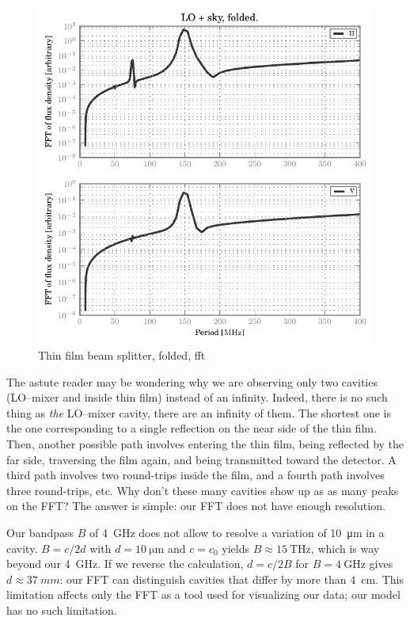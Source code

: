 \begin{figure}[hbtp]
    \centering
    \includegraphics{thin_film_beam_splitter_folded_fft}
    \caption{Thin film beam splitter, folded, fft}
    \label{fig:thin_film_beam_splitter_folded_fft}
\end{figure}

The astute reader may be wondering why we are observing only two cavities (LO--mixer and inside thin film) instead of an infinity.
Indeed, there is no such thing as \textit{the} LO--mixer cavity, there are an infinity of them.
The shortest one is the one corresponding to a single reflection on the near side of the thin film.
Then, another possible path involves entering the thin film, being reflected by the far side, traversing the film again, and being transmitted toward the detector.
A third path involves two round-trips inside the film, and a fourth path involves three round-trips, etc.
Why don't these many cavities show up as as many peaks on the FFT?
The answer is simple: our FFT does not have enough resolution.

Our bandpass $B$ of \SI{4}{\giga\hertz} does not allow to resolve a variation of \SI{10}{\micro\meter} in a cavity.
$B = c / 2d$ with $d=\SI{10}{\micro\meter}$ and $c=c_0$ yields $B \approx \SI{15}{\tera\hertz}$, which is way beyond our \SI{4}{\giga\hertz}.
If we reverse the calculation, $d=c/2B$ for $B=\SI{4}{\giga\hertz}$ gives $d \approx \SI{37}{mm}$: our FFT can distinguish cavities that differ by more than \SI{4}{\centi\meter}.
This limitation affects only the FFT as a tool used for visualizing our data; our model has no such limitation.

